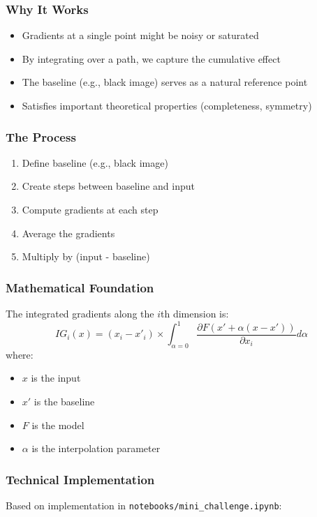 \documentclass{article}
\begin{document}
\subsubsection{Why It Works}
\begin{itemize}
    \item Gradients at a single point might be noisy or saturated
    \item By integrating over a path, we capture the cumulative effect
    \item The baseline (e.g., black image) serves as a natural reference point
    \item Satisfies important theoretical properties (completeness, symmetry)
\end{itemize}

\subsubsection{The Process}
\begin{enumerate}
    \item Define baseline (e.g., black image)
    \item Create steps between baseline and input
    \item Compute gradients at each step
    \item Average the gradients
    \item Multiply by (input - baseline)
\end{enumerate}

\subsubsection{Mathematical Foundation}
The integrated gradients along the $i$th dimension is:
\begin{equation}
    IG_i(x) = (x_i - x'_i) \times \int_{\alpha=0}^{1} \frac{\partial F(x' + \alpha(x-x'))}{\partial x_i} d\alpha
\end{equation}
where:
\begin{itemize}
    \item $x$ is the input
    \item $x'$ is the baseline
    \item $F$ is the model
    \item $\alpha$ is the interpolation parameter
\end{itemize}

\subsubsection{Technical Implementation}
Based on implementation in \texttt{notebooks/mini\_challenge.ipynb}:
\end{document}
